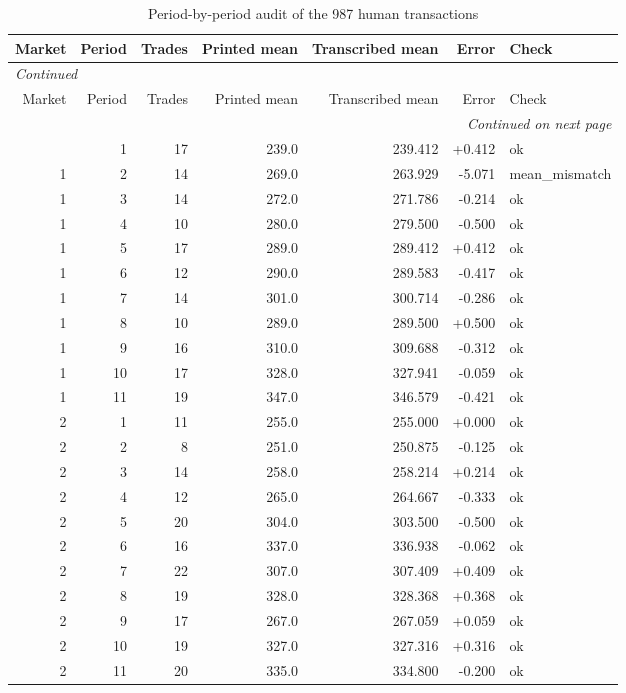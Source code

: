 \scriptsize
\begin{longtable}{rrrrrrl}
\caption{Period-by-period audit of the 987 human transactions}\label{tab:app-human-validation}\\
\toprule
Market & Period & Trades & Printed mean & Transcribed mean & Error & Check \\
\midrule
\endfirsthead
\multicolumn{7}{l}{\textit{Continued}}\\
\toprule
Market & Period & Trades & Printed mean & Transcribed mean & Error & Check \\
\midrule
\endhead
\midrule
\multicolumn{7}{r}{\textit{Continued on next page}}\\
\endfoot
\bottomrule
\endlastfoot
1 & 1 & 17 & 239.0 & 239.412 & +0.412 & ok \\
1 & 2 & 14 & 269.0 & 263.929 & -5.071 & mean\_mismatch \\
1 & 3 & 14 & 272.0 & 271.786 & -0.214 & ok \\
1 & 4 & 10 & 280.0 & 279.500 & -0.500 & ok \\
1 & 5 & 17 & 289.0 & 289.412 & +0.412 & ok \\
1 & 6 & 12 & 290.0 & 289.583 & -0.417 & ok \\
1 & 7 & 14 & 301.0 & 300.714 & -0.286 & ok \\
1 & 8 & 10 & 289.0 & 289.500 & +0.500 & ok \\
1 & 9 & 16 & 310.0 & 309.688 & -0.312 & ok \\
1 & 10 & 17 & 328.0 & 327.941 & -0.059 & ok \\
1 & 11 & 19 & 347.0 & 346.579 & -0.421 & ok \\
2 & 1 & 11 & 255.0 & 255.000 & +0.000 & ok \\
2 & 2 & 8 & 251.0 & 250.875 & -0.125 & ok \\
2 & 3 & 14 & 258.0 & 258.214 & +0.214 & ok \\
2 & 4 & 12 & 265.0 & 264.667 & -0.333 & ok \\
2 & 5 & 20 & 304.0 & 303.500 & -0.500 & ok \\
2 & 6 & 16 & 337.0 & 336.938 & -0.062 & ok \\
2 & 7 & 22 & 307.0 & 307.409 & +0.409 & ok \\
2 & 8 & 19 & 328.0 & 328.368 & +0.368 & ok \\
2 & 9 & 17 & 267.0 & 267.059 & +0.059 & ok \\
2 & 10 & 19 & 327.0 & 327.316 & +0.316 & ok \\
2 & 11 & 20 & 335.0 & 334.800 & -0.200 & ok \\

\end{longtable}
